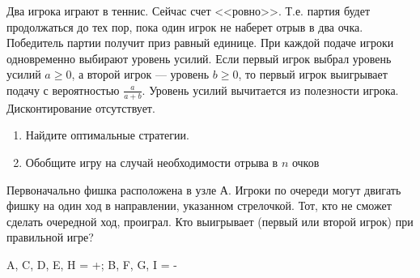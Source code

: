 \begin{problem}
\begin{source}
\cite{lones:dtc}\end{source}
Два игрока играют в теннис. Сейчас счет <<ровно>>. Т.е. партия будет продолжаться до тех пор, пока один игрок не наберет отрыв в два очка. Победитель партии получит приз равный единице. При каждой подаче игроки одновременно выбирают уровень усилий. Если первый игрок выбрал уровень усилий $a\ge 0$, а второй игрок --- уровень $b\ge 0$, то первый игрок выигрывает подачу с вероятностью $\frac{a}{a+b}$. Уровень усилий вычитается из полезности игрока. Дисконтирование отсутствует. \par
\begin{enumerate}
\item  Найдите оптимальные стратегии. \par
\item Обобщите игру на случай необходимости отрыва в $n$ очков \par
\end{enumerate}




\begin{sol}

\end{sol}
\end{problem}



\begin{problem}

Первоначально фишка расположена в узле А. Игроки по очереди могут двигать фишку на один ход в направлении, указанном стрелочкой. Тот, кто не сможет сделать очередной ход, проиграл. Кто выигрывает (первый или второй игрок) при правильной игре?

\begin{sol}
 A, C, D, E, H = +; B, F, G, I = -
\end{sol}
\end{problem}



